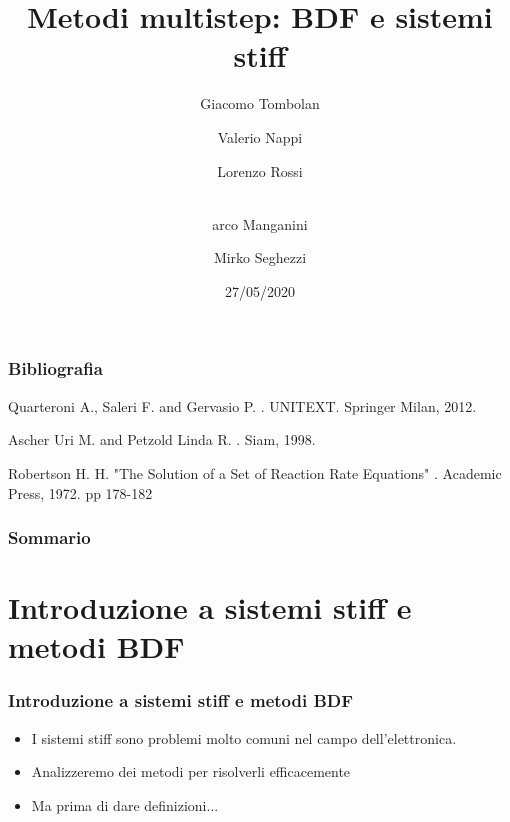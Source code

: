 \documentclass[aspectratio=169, 10pt, handout,usenames,dvipsnames]{beamer}
\title{Metodi multistep: BDF e sistemi stiff}
\date{27/05/2020}
\author{Giacomo Tombolan \and Valerio Nappi \and 
      Lorenzo Rossi \and  \texorpdfstring{\\} Marco Manganini \and
      Mirko Seghezzi}
\begin{document}
\begin{frame}
  \maketitle
\end{frame}


\begin{frame}


  \frametitle{Bibliografia}
  \begin{thebibliography}{99}\small
    
    Quarteroni A., Saleri F. and Gervasio P.
    .
    \newblock UNITEXT. Springer Milan, 2012.

    Ascher Uri M. and Petzold Linda R.
    .
    \newblock Siam, 1998.

    Robertson H. H. "The Solution of a Set of Reaction Rate Equations"
    .
    \newblock Academic Press, 1972. pp 178-182
  

   \end{thebibliography}

  
\end{frame}  




\begin{frame}
  \frametitle{Sommario}
  \tableofcontents
\end{frame}


\section{Introduzione a sistemi stiff e metodi BDF}\label{sec:sec1}
\begin{frame} \frametitle{Introduzione a sistemi stiff e metodi BDF}
    \begin{itemize}
        \item I sistemi stiff sono problemi molto comuni nel campo dell'elettronica. 
        \item Analizzeremo dei metodi per risolverli efficacemente
        \item Ma prima di dare definizioni...
    \end{itemize}
\end{frame}
\end{document}
